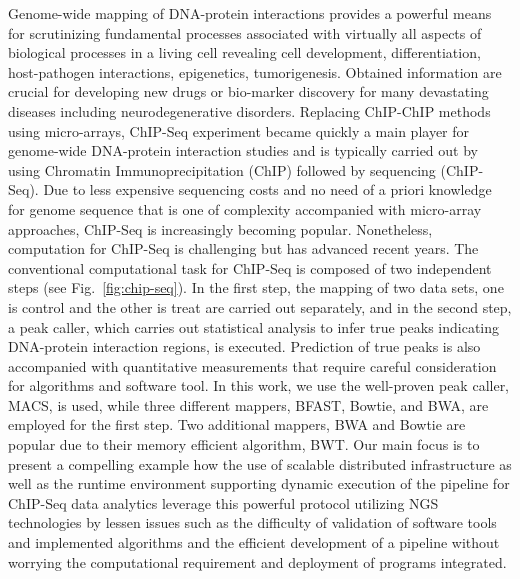 \documentclass{cpeauth}
\begin{document}
Genome-wide mapping of DNA-protein interactions provides a powerful
means for scrutinizing fundamental processes associated with virtually
all aspects of biological processes in a living cell revealing cell
development, differentiation, host-pathogen interactions, epigenetics,
tumorigenesis. Obtained information are crucial for developing new
drugs or bio-marker discovery for many devastating diseases including
neurodegenerative disorders\cite{pepke2009,laajala}.  Replacing
ChIP-ChIP methods using micro-arrays, ChIP-Seq experiment became
quickly a main player for genome-wide DNA-protein interaction studies
and is typically carried out by using Chromatin Immunoprecipitation
(ChIP) followed by sequencing (ChIP-Seq).  Due to less expensive
sequencing costs and no need of a priori knowledge for genome sequence
that is one of complexity accompanied with micro-array approaches,
ChIP-Seq is increasingly becoming popular.  Nonetheless, computation
for ChIP-Seq is challenging but has advanced recent
years\cite{pepke2009,laajala}.  The conventional computational task
for ChIP-Seq is composed of two independent steps (see
Fig.~\ref{fig:chip-seq}).  In the first step, the mapping of two data
sets, one is control and the other is treat are carried out
separately, and in the second step, a peak caller, which carries out
statistical analysis to infer true peaks indicating DNA-protein
interaction regions, is executed.  Prediction of true peaks is also
accompanied with quantitative measurements that require careful
consideration for algorithms and software tool.  In this work, we use
the well-proven peak caller, MACS\cite{macs}, is used, while three
different mappers, BFAST, Bowtie, and BWA, are employed for the first
step.  Two additional mappers, BWA and Bowtie are popular due to their
memory efficient algorithm, BWT.  Our main focus is to present a
compelling example how the use of scalable distributed infrastructure
as well as the runtime environment supporting dynamic execution of the
pipeline for ChIP-Seq data analytics leverage this powerful protocol
utilizing NGS technologies by lessen issues such as the difficulty of
validation of software tools and implemented algorithms and the
efficient development of a pipeline without worrying the computational
requirement and deployment of programs integrated.
\end{document}
